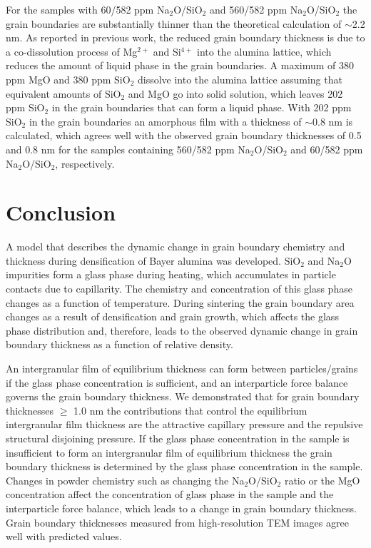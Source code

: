 For the samples with 60/582 ppm Na$_{2}$O/SiO$_{2}$ and 560/582 ppm Na$_{2}$O/SiO$_{2}$ the grain boundaries are substantially thinner than the theoretical calculation of $\sim$2.2 nm. As reported in previous work, the reduced grain boundary thickness is due to a co-dissolution process of Mg$^{2+}$ and Si$^{4+}$ into the alumina lattice, which reduces the amount of liquid phase in the grain boundaries. A maximum of 380 ppm MgO and 380 ppm SiO$_{2}$ dissolve into the alumina lattice assuming that equivalent amounts of SiO$_{2}$ and MgO go into solid solution, which leaves 202 ppm SiO$_{2}$ in the grain boundaries that can form a liquid phase. With 202 ppm SiO$_{2}$ in the grain boundaries an amorphous film with a thickness of $\sim$0.8 nm is calculated, which agrees well with the observed grain boundary thicknesses of 0.5 and 0.8 nm for the samples containing 560/582 ppm Na$_{2}$O/SiO$_{2}$ and 60/582 ppm Na$_{2}$O/SiO$_{2}$, respectively.

\section{Conclusion}
A model that describes the dynamic change in grain boundary chemistry and thickness during densification of Bayer alumina was developed. SiO$_{2}$ and Na$_{2}$O impurities form a glass phase during heating, which accumulates in particle contacts due to capillarity. The chemistry and concentration of this glass phase changes as a function of temperature. During sintering the grain boundary area changes as a result of densification and grain growth, which affects the glass phase distribution and, therefore, leads to the observed dynamic change in grain boundary thickness as a function of relative density. 

An intergranular film of equilibrium thickness can form between particles/grains if the glass phase concentration is sufficient, and an interparticle force balance governs the grain boundary thickness. We demonstrated that for grain boundary thicknesses $\geq$ 1.0 nm the contributions that control the equilibrium intergranular film thickness are the attractive capillary pressure and the repulsive structural disjoining pressure. If the glass phase concentration in the sample is insufficient to form an intergranular film of equilibrium thickness the grain boundary thickness is determined by the glass phase concentration in the sample. Changes in powder chemistry such as changing the Na$_{2}$O/SiO$_{2}$ ratio or the MgO concentration affect the concentration of glass phase in the sample and the interparticle force balance, which leads to a change in grain boundary thickness. Grain boundary thicknesses measured from high-resolution TEM images agree well with predicted values.

